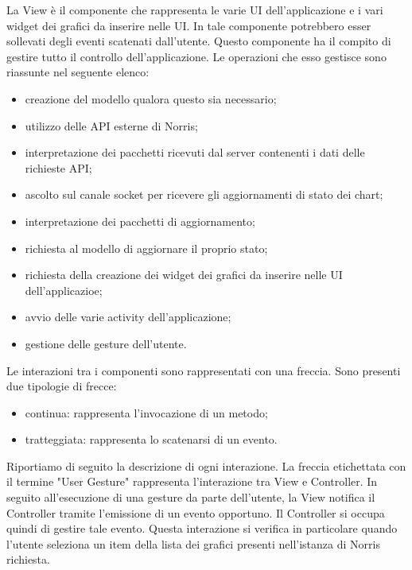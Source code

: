         La View è il componente che rappresenta le varie UI dell'applicazione e i vari widget dei grafici da inserire nelle UI. In tale componente potrebbero esser sollevati degli eventi scatenati dall'utente.
        Questo componente ha il compito di gestire tutto il controllo dell'applicazione. Le operazioni che esso gestisce sono riassunte nel seguente elenco:
        	\begin{itemize}
        		\item creazione del modello qualora questo sia necessario;
        		\item utilizzo delle API esterne di Norris;
        		\item interpretazione dei pacchetti ricevuti dal server contenenti i dati delle richieste API;
        		\item ascolto sul canale socket per ricevere gli aggiornamenti di stato dei chart;
        		\item interpretazione dei pacchetti di aggiornamento;
        		\item richiesta al modello di aggiornare il proprio stato;
        		\item richiesta della creazione dei widget dei grafici da inserire nelle UI dell'applicazioe;
        		\item avvio delle varie activity dell'applicazione;
        		\item gestione delle gesture dell'utente.
        \end{itemize}
    	Le interazioni tra i componenti sono rappresentati con una freccia. Sono presenti due tipologie di frecce:
    	\begin{itemize}
    			\item{continua: } rappresenta l'invocazione di un metodo;
    			\item{tratteggiata: } rappresenta lo scatenarsi di un evento.
    		\end{itemize}
    	Riportiamo di seguito la descrizione di ogni interazione.
	    La freccia etichettata con il termine "User Gesture" rappresenta l'interazione tra View e Controller. In seguito all'esecuzione di una gesture da parte dell'utente, la View notifica il Controller tramite l'emissione di un evento opportuno. Il Controller si occupa quindi di gestire tale evento. Questa interazione si verifica in particolare quando l'utente seleziona un item della lista dei grafici presenti nell'istanza di Norris richiesta.
